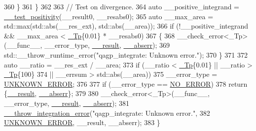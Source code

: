 \begin{DoxyCode}
360             \}
361         \}
362 
363       \textcolor{comment}{// Test on divergence.}
364       \textcolor{keyword}{auto} \_\_positive\_integrand = \hyperlink{namespace____gnu__cxx_a5e2bf5bffa1d3764b8dc10d04d5c66db}{\_\_test\_positivity}(\_\_result0, \_\_resabs0);
365       \textcolor{keyword}{auto} \_\_max\_area = std::max(std::abs(\_\_res\_ext), std::abs(\_\_area));
366       \textcolor{keywordflow}{if} (!\_\_positive\_integrand && \_\_max\_area < \hyperlink{namespace____gnu__cxx_a3b19a9c800ca194374ef9172290f7d79}{\_Tp}\{0.01\} * \_\_resabs0)
367         \{
368           \_\_check\_error<\_Tp>(\_\_func\_\_, \_\_error\_type, \hyperlink{namespace____gnu__cxx_a500ea9f53aeaecd8c2ae657503450578}{\_\_result}, \hyperlink{namespace____gnu__cxx_a72f736cff127f1574e91a301de9e074b}{\_\_abserr});
369           std::\_\_throw\_runtime\_error(\textcolor{stringliteral}{"qagp\_integrate: Unknown error."});
370         \}
371 
372       \textcolor{keyword}{auto} \_\_ratio = \_\_res\_ext / \_\_area;
373       \textcolor{keywordflow}{if} (\_\_ratio < \hyperlink{namespace____gnu__cxx_a3b19a9c800ca194374ef9172290f7d79}{\_Tp}\{0.01\} || \_\_ratio > \hyperlink{namespace____gnu__cxx_a3b19a9c800ca194374ef9172290f7d79}{\_Tp}\{100\}
374           || \_\_errsum > std::abs(\_\_area))
375         \_\_error\_type = \hyperlink{namespace____gnu__cxx_ad6c62dd86a596716cece6ac2d4cfd4b3a7c57c614db2692fad0a19cb2ded33ed3}{UNKNOWN\_ERROR};
376 
377       \textcolor{keywordflow}{if} (\_\_error\_type == \hyperlink{namespace____gnu__cxx_ad6c62dd86a596716cece6ac2d4cfd4b3ac31eecc280b10dec2efb4a2216ccc2e0}{NO\_ERROR})
378         \textcolor{keywordflow}{return} \{\hyperlink{namespace____gnu__cxx_a500ea9f53aeaecd8c2ae657503450578}{\_\_result}, \hyperlink{namespace____gnu__cxx_a72f736cff127f1574e91a301de9e074b}{\_\_abserr}\};
379 
380       \_\_check\_error<\_Tp>(\_\_func\_\_, \_\_error\_type, \hyperlink{namespace____gnu__cxx_a500ea9f53aeaecd8c2ae657503450578}{\_\_result}, \hyperlink{namespace____gnu__cxx_a72f736cff127f1574e91a301de9e074b}{\_\_abserr});
381       \hyperlink{namespace____gnu__cxx_a2ae22137ca092b8ae10f4d42b4e32cfb}{\_\_throw\_integration\_error}(\textcolor{stringliteral}{"qagp\_integrate: Unknown error."},
382                                 \hyperlink{namespace____gnu__cxx_ad6c62dd86a596716cece6ac2d4cfd4b3a7c57c614db2692fad0a19cb2ded33ed3}{UNKNOWN\_ERROR}, \_\_result, \_\_abserr);
383     \}
\end{DoxyCode}
\mbox{\label{namespace____gnu__cxx_afde6c192a4e11d49f4c9c117277980ff}} 
